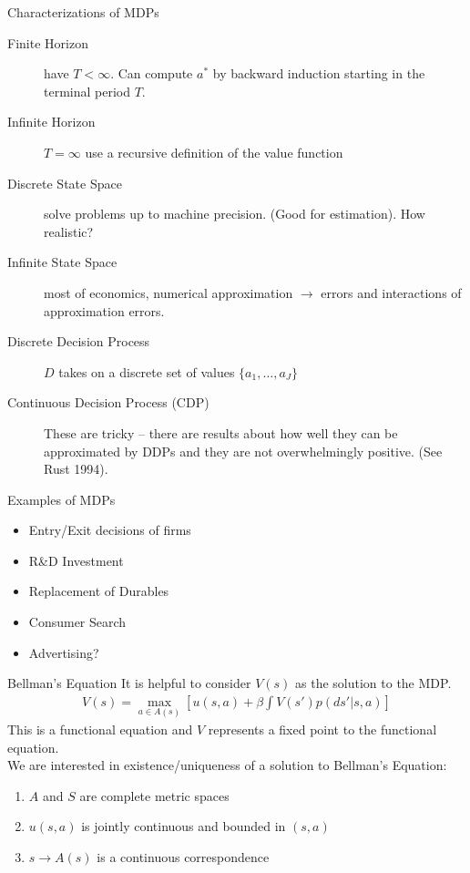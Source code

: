 \begin{frame}{Characterizations of MDPs}
\begin{description}
\item[Finite Horizon] have $T < \infty$. Can compute $a^*$ by backward induction starting in the terminal period $T$.
\item[Infinite Horizon] $T=\infty$ use a recursive definition of the value function
\item[Discrete State Space] solve problems up to machine precision. (Good for estimation).  How realistic?
\item[Infinite State Space] most of economics, numerical approximation $\rightarrow$  errors and interactions of approximation errors.
\item [Discrete Decision Process] $D$ takes on a discrete set of values $\{a_1,\ldots,a_J\}$
\item[Continuous Decision Process (CDP)] These are tricky -- there are results about how well they can be approximated by DDPs and they are not overwhelmingly positive. (See Rust 1994).
\end{description}
\end{frame}

\begin{frame}{Examples of MDPs}
\begin{itemize}
\item Entry/Exit decisions of firms
\item R\&D Investment
\item Replacement of Durables
\item Consumer Search
\item Advertising?
\end{itemize}
\end{frame}

\begin{frame}{Bellman's Equation}
It is helpful to consider $V(s)$ as the solution to the MDP.  
\begin{eqnarray*}
V(s) = \max_{a \in A(s)} [ u(s,a) + \beta \int V(s') p(ds' | s,a)]
\end{eqnarray*}
This is a \alert{functional equation} and $V$ represents a \alert{fixed point} to the functional equation.\\
\vspace{0.5cm}
We are interested in existence/uniqueness of a solution to Bellman's Equation:
\begin{enumerate}
\item $A$ and $S$ are complete metric spaces
\item $u(s,a)$ is jointly continuous and bounded in $(s,a)$
\item $s \rightarrow A(s)$ is a continuous correspondence
\end{enumerate}
\end{frame}


